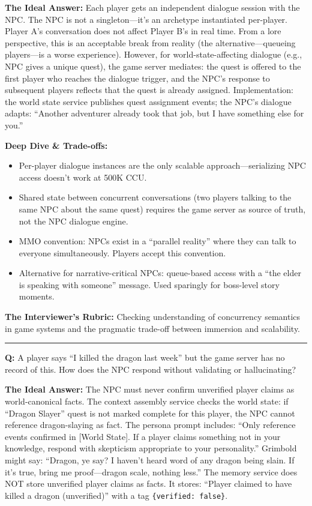 \textbf{The Ideal Answer:} Each player gets an independent dialogue session with the NPC. The NPC is not a singleton---it's an archetype instantiated per-player. Player A's conversation does not affect Player B's in real time. From a lore perspective, this is an acceptable break from reality (the alternative---queueing players---is a worse experience). However, for world-state-affecting dialogue (e.g., NPC gives a unique quest), the game server mediates: the quest is offered to the first player who reaches the dialogue trigger, and the NPC's response to subsequent players reflects that the quest is already assigned. Implementation: the world state service publishes quest assignment events; the NPC's dialogue adapts: ``Another adventurer already took that job, but I have something else for you.''

\textbf{Deep Dive \& Trade-offs:}
\begin{itemize}
  \item Per-player dialogue instances are the only scalable approach---serializing NPC access doesn't work at 500K CCU.
  \item Shared state between concurrent conversations (two players talking to the same NPC about the same quest) requires the game server as source of truth, not the NPC dialogue engine.
  \item MMO convention: NPCs exist in a ``parallel reality'' where they can talk to everyone simultaneously. Players accept this convention.
  \item Alternative for narrative-critical NPCs: queue-based access with a ``the elder is speaking with someone'' message. Used sparingly for boss-level story moments.
\end{itemize}

\textbf{The Interviewer's Rubric:} Checking understanding of concurrency semantics in game systems and the pragmatic trade-off between immersion and scalability.

\bigskip\hrule\bigskip

\textbf{Q:} A player says ``I killed the dragon last week'' but the game server has no record of this. How does the NPC respond without validating or hallucinating?

\textbf{The Ideal Answer:} The NPC must never confirm unverified player claims as world-canonical facts. The context assembly service checks the world state: if ``Dragon Slayer'' quest is not marked complete for this player, the NPC cannot reference dragon-slaying as fact. The persona prompt includes: ``Only reference events confirmed in [World State]. If a player claims something not in your knowledge, respond with skepticism appropriate to your personality.'' Grimbold might say: ``Dragon, ye say? I haven't heard word of any dragon being slain. If it's true, bring me proof---dragon scale, nothing less.'' The memory service does NOT store unverified player claims as facts. It stores: ``Player claimed to have killed a dragon (unverified)'' with a tag \texttt{\{verified: false\}}.

